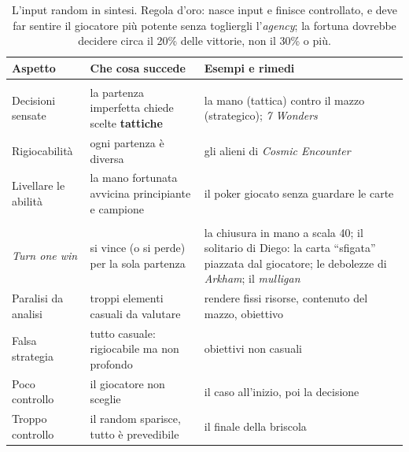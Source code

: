 \begin{table}[htbp]
\centering
\small
\begin{tabular}{@{}>{\raggedright\arraybackslash}p{3.4cm}>{\raggedright\arraybackslash}p{5.0cm}>{\raggedright\arraybackslash}p{5.2cm}@{}}
\toprule
\textbf{Aspetto} & \textbf{Che cosa succede} & \textbf{Esempi e rimedi} \\
\midrule
\multicolumn{3}{@{}l}{\emph{Vantaggi}} \\
Decisioni sensate & la partenza imperfetta chiede scelte \textbf{tattiche} & la mano
  (tattica) contro il mazzo (strategico); \emph{7 Wonders} \\
\addlinespace
Rigiocabilità & ogni partenza è diversa & gli alieni di \emph{Cosmic Encounter} \\
\addlinespace
Livellare le abilità & la mano fortunata avvicina principiante e campione & il poker
  giocato senza guardare le carte \\
\midrule
\multicolumn{3}{@{}l}{\emph{Rischi}} \\
\emph{Turn one win} & si vince (o si perde) per la sola partenza & la chiusura in mano a
  scala 40; il solitario di Diego: la carta ``sfigata'' piazzata dal giocatore; le
  debolezze di \emph{Arkham}; il \emph{mulligan} \\
\addlinespace
Paralisi da analisi & troppi elementi casuali da valutare & rendere fissi risorse,
  contenuto del mazzo, obiettivo \\
\addlinespace
Falsa strategia & tutto casuale: rigiocabile ma non profondo & obiettivi non casuali \\
\addlinespace
Poco controllo & il giocatore non sceglie & il caso all'inizio, poi la decisione \\
\addlinespace
Troppo controllo & il random sparisce, tutto è prevedibile & il finale della briscola \\
\bottomrule
\end{tabular}
\caption{L'input random in sintesi. Regola d'oro: nasce input e finisce controllato, e deve
far sentire il giocatore più potente senza togliergli l'\emph{agency}; la fortuna dovrebbe
decidere circa il 20\% delle vittorie, non il 30\% o più.}
\label{a15:tab:input}
\end{table}

